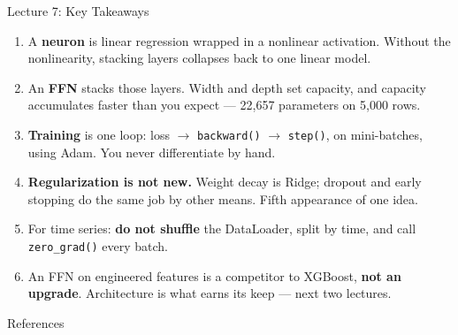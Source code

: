 \documentclass[aspectratio=169, 11pt]{beamer}
\begin{document}
\begin{frame}{Lecture 7: Key Takeaways}
  \begin{keybox}
    {\footnotesize
    \begin{enumerate}\itemsep2pt
      \item A \textbf{neuron} is linear regression wrapped in a nonlinear activation. Without
            the nonlinearity, stacking layers collapses back to one linear model.

      \item An \textbf{FFN} stacks those layers. Width and depth set capacity, and capacity
            accumulates faster than you expect --- 22{,}657 parameters on 5{,}000 rows.

      \item \textbf{Training} is one loop: loss $\to$ \texttt{backward()} $\to$
            \texttt{step()}, on mini-batches, using Adam. You never differentiate by hand.

      \item \textbf{Regularization is not new.} Weight decay is Ridge; dropout and early
            stopping do the same job by other means. Fifth appearance of one idea.

      \item For time series: \textbf{do not shuffle} the DataLoader, split by time, and call
            \texttt{zero\_grad()} every batch.

      \item An FFN on engineered features is a competitor to XGBoost, \textbf{not an upgrade}.
            Architecture is what earns its keep --- next two lectures.
    \end{enumerate}
    }
  \end{keybox}
\end{frame}

\begin{frame}[allowframebreaks]{References}
  \printbibliography[heading=none]
\end{frame}

\end{document}
